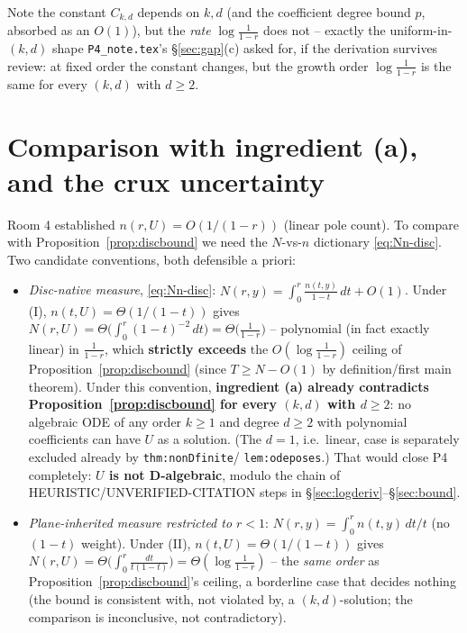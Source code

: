 \documentclass[11pt]{article}
\theoremstyle{remark}
\begin{document}
Note the constant $C_{k,d}$ depends on $k,d$ (and the coefficient degree bound $p$, absorbed as an
$O(1)$), but the \emph{rate} $\log\frac1{1-r}$ does not -- exactly the uniform-in-$(k,d)$ shape
\texttt{P4\_note.tex}'s \S\ref{sec:gap}(c) asked for, if the derivation survives review: at fixed
order the constant changes, but the growth order $\log\frac1{1-r}$ is the same for every $(k,d)$
with $d\ge2$.

\section{Comparison with ingredient (a), and the crux uncertainty}\label{sec:crux}

Room 4 established $n(r,U)=O(1/(1-r))$ (linear pole count). To compare with
Proposition~\ref{prop:discbound} we need the $N$-vs-$n$ dictionary \eqref{eq:Nn-disc}. Two
candidate conventions, both defensible a priori:

\begin{itemize}
\item[(I)] \emph{Disc-native measure}, \eqref{eq:Nn-disc}: $N(r,y)=\int_0^r
\frac{n(t,y)}{1-t}\,dt+O(1)$. Under (I), $n(t,U)=\Theta(1/(1-t))$ gives
$N(r,U)=\Theta\big(\int_0^r(1-t)^{-2}\,dt\big)=\Theta\big(\tfrac1{1-r}\big)$ -- polynomial (in
fact exactly linear) in $\frac1{1-r}$, which \textbf{strictly exceeds} the
$O(\log\frac1{1-r})$ ceiling of Proposition~\ref{prop:discbound} (since $T\ge N-O(1)$ by
definition/first main theorem). Under this convention, \textbf{ingredient (a) already
contradicts Proposition~\ref{prop:discbound} for every $(k,d)$ with $d\ge2$}: no algebraic ODE of
any order $k\ge1$ and degree $d\ge2$ with polynomial coefficients can have $U$ as a solution. (The
$d=1$, i.e.\ linear, case is separately excluded already by \texttt{thm:nonDfinite}/
\texttt{lem:odeposes}.) That would close P4 completely: \textbf{$U$ is not D-algebraic}, modulo
the chain of HEURISTIC/UNVERIFIED-CITATION steps in \S\ref{sec:logderiv}--\S\ref{sec:bound}.
\item[(II)] \emph{Plane-inherited measure restricted to $r<1$}: $N(r,y)=\int_0^rn(t,y)\,dt/t$
(no $(1-t)$ weight). Under (II), $n(t,U)=\Theta(1/(1-t))$ gives $N(r,U)=\Theta\big(\int_0^r
\frac{dt}{t(1-t)}\big)=\Theta(\log\frac1{1-r})$ -- the \emph{same order} as
Proposition~\ref{prop:discbound}'s ceiling, a borderline case that decides nothing (the bound is
consistent with, not violated by, a $(k,d)$-solution; the comparison is inconclusive, not
contradictory).
\end{itemize}
\end{document}
